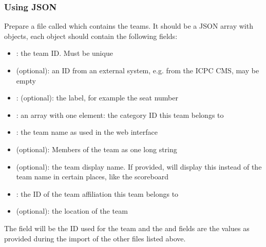 \documentclass[a4paper,10pt,english,openany]{sphinxmanual}
\begin{document}
\subsubsection{Using JSON}
\label{\detokenize{import:id1}}
\sphinxAtStartPar
Prepare a file called  which contains the teams.
It should be a JSON array with objects, each object should contain the following
fields:
\begin{itemize}
\item {} 
\sphinxAtStartPar
{}: the team ID. Must be unique

\item {} 
\sphinxAtStartPar
{} (optional): an ID from an external system, e.g. from the ICPC CMS, may be empty

\item {} 
\sphinxAtStartPar
{}: (optional): the label, for example the seat number

\item {} 
\sphinxAtStartPar
{}: an array with one element: the category ID this team belongs to

\item {} 
\sphinxAtStartPar
{}: the team name as used in the web interface

\item {} 
\sphinxAtStartPar
{} (optional): Members of the team as one long string

\item {} 
\sphinxAtStartPar
{} (optional): the team display name. If provided, will display
this instead of the team name in certain places, like the scoreboard

\item {} 
\sphinxAtStartPar
{}: the ID of the team affiliation this team belongs to

\item {} 
\sphinxAtStartPar
{} (optional): the location of the team

\end{itemize}

\sphinxAtStartPar
The  field will be the ID used for the team and the  and 
fields are the values as provided during the import of the other files listed above.
\end{document}
